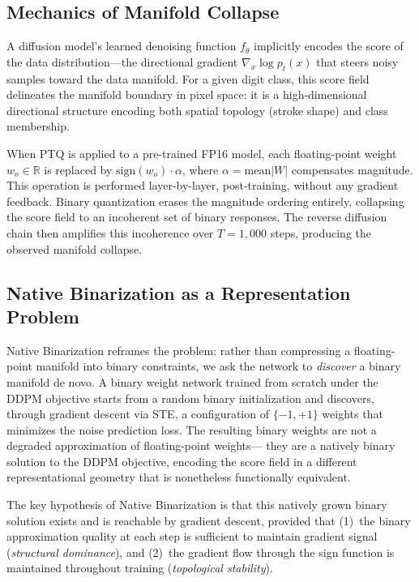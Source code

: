 \documentclass[conference]{IEEEtran}
\begin{document}
\subsection{Mechanics of Manifold Collapse}

A diffusion model's learned denoising function $f_\theta$ implicitly encodes the score
of the data distribution---the directional gradient $\nabla_x \log p_t(x)$ that steers
noisy samples toward the data manifold. For a given digit class, this score field
delineates the manifold boundary in pixel space: it is a high-dimensional directional
structure encoding both spatial topology (stroke shape) and class membership.

When PTQ is applied to a pre-trained FP16 model, each floating-point weight
$w_o \in \mathbb{R}$ is replaced by $\text{sign}(w_o)\cdot\alpha$, where
$\alpha = \text{mean}|W|$ compensates magnitude. This operation is performed
layer-by-layer, post-training, without any gradient feedback. Binary quantization erases
the magnitude ordering entirely, collapsing the score field to an incoherent set of
binary responses. The reverse diffusion chain then amplifies this incoherence over
$T=1{,}000$ steps, producing the observed manifold collapse.

\subsection{Native Binarization as a Representation Problem}

Native Binarization reframes the problem: rather than compressing a floating-point
manifold into binary constraints, we ask the network to \emph{discover} a binary manifold
de novo. A binary weight network trained from scratch under the DDPM objective starts
from a random binary initialization and discovers, through gradient descent via STE, a
configuration of $\{-1,+1\}$ weights that minimizes the noise prediction loss. The
resulting binary weights are not a degraded approximation of floating-point weights---
they are a natively binary solution to the DDPM objective, encoding the score field in a
different representational geometry that is nonetheless functionally equivalent.

The key hypothesis of Native Binarization is that this natively grown binary solution
exists and is reachable by gradient descent, provided that (1)~the binary approximation
quality at each step is sufficient to maintain gradient signal (\emph{structural
dominance}), and (2)~the gradient flow through the sign function is maintained throughout
training (\emph{topological stability}).
\end{document}
